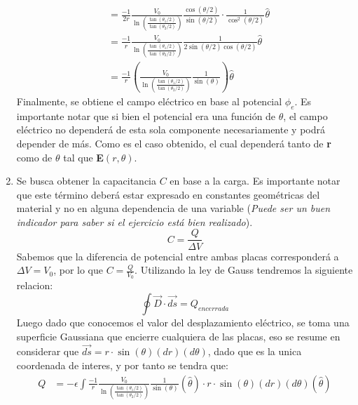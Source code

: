 \documentclass[
  11pt,
  letterpaper,
   addpoints,
   answers
  ]{exam}
\begin{document}
\begin{questions}
\begin{solution}
\begin{enumerate}
\begin{equation}
\begin{aligned}
                       &= \frac{-1}{2r} \frac{V_{0}}{\ln\left(\frac{\tan(\theta_{1}/2)}{\tan(\theta_{2}/2)}\right)}\frac{\cos(\theta/2)}{\sin(\theta/2)}\cdot \frac{1}{\cos^{2}(\theta/2)}\hat{\theta} \\
                       &=\frac{-1}{r} \frac{V_{0}}{\ln\left(\frac{\tan(\theta_{1}/2)}{\tan(\theta_{2}/2)}\right)}\frac{1}{2\sin(\theta/2)\cos(\theta/2)}\hat{\theta} \\
                       &=\frac{-1}{r} \left(\frac{V_{0}}{\ln\left(\frac{\tan(\theta_{1}/2)}{\tan(\theta_{2}/2)}\right)}\frac{1}{\sin(\theta)}\right)\hat{\theta}
        \end{aligned}
    \end{equation}
    Finalmente, se obtiene el campo eléctrico en base al potencial $\phi_{e}$. Es importante notar que si bien el potencial era una función de $\theta$, el campo eléctrico no dependerá de esta sola componente necesariamente y podrá depender de más. Como es el caso obtenido, el cual dependerá tanto de \textbf{r} como de \textbf{$\theta$} tal que \textbf{E}$(r,\theta)$.
    \item Se busca obtener la capacitancia $C$ en base a la carga. Es importante notar que este término deberá estar expresado en constantes geométricas del material y no en alguna dependencia de una variable (\textit{Puede ser un buen indicador para saber si el ejercicio está bien realizado}).
    \begin{equation}
        C = \frac{Q}{\Delta V}
    \end{equation}
    Sabemos que la diferencia de potencial entre ambas placas corresponderá a $\Delta V = V_{0}$, por lo que $ C = \frac{Q}{V_{0}}$. Utilizando la ley de Gauss tendremos la siguiente relacion:
    \begin{equation}
            \oint \Vec{D} \cdot \Vec{ds} = Q_{encerrada} 
    \end{equation}
    Luego dado que conocemos el valor del desplazamiento eléctrico, se toma una superficie Gaussiana que encierre cualquiera de las placas, eso se resume en considerar que $\vec{ds}=  r\cdot \sin(\theta)(dr) (d\theta)$, dado que es la unica coordenada de interes, y por tanto se tendra que:
    \begin{equation}
        \begin{aligned}
            Q &= -\epsilon \int \frac{-1}{r} \frac{V_{0}}{\ln\left(\frac{\tan(\theta_{1}/2)}{\tan(\theta_{2}/2)}\right)}\frac{1}{\sin(\theta)}(\hat{\theta}) \cdot r\cdot \sin(\theta)(dr) (d\theta)(\hat{\theta}) \\

\end{aligned}
\end{equation}
\end{enumerate}
\end{solution}
\end{questions}
\end{document}

